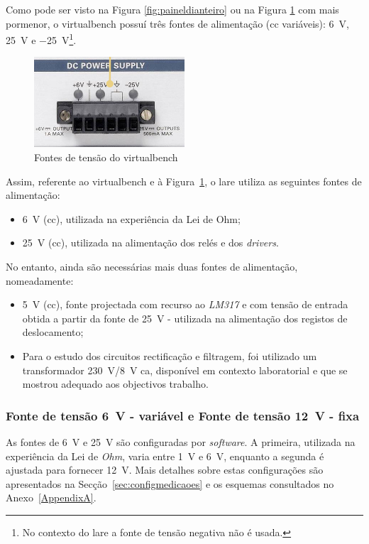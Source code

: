 Como pode ser visto na Figura \ref{fig:paineldianteiro} ou na Figura \ref{fig:promenorfontes} com mais pormenor, o \acrshort{virtualbench} possuí três fontes de alimentação (\acrshort{cc} variáveis): \SI{+6}{\volt}, \SI{+25}{\volt} e \SI{-25}{\volt}\footnote{No contexto do \acrshort{lare} a fonte de tensão negativa não é usada.}.

\begin{figure}[hbtp]
	\centering
	\includegraphics[width=0.5\textwidth]{figures/fontes_VB.png}
	\caption{Fontes de tensão do \acrshort{virtualbench}}
	\label{fig:promenorfontes}
\end{figure}

Assim, referente ao \acrshort{virtualbench} e à Figura~\ref{fig:promenorfontes}, o \acrshort{lare} utiliza as seguintes fontes de alimentação:
\begin{itemize}
	\item \SI{6}{\volt} (\acrshort{cc}), utilizada na experiência da Lei de Ohm;
	\item \SI{25}{\volt} (\acrshort{cc}), utilizada na alimentação dos relés e dos \textit{drivers}.
\end{itemize}

No entanto, ainda são necessárias mais duas fontes de alimentação, nomeadamente:
\begin{itemize}
	\item \SI{5}{\volt} (\acrshort{cc}), fonte projectada com recurso ao \textit{LM317} e com tensão de entrada obtida a partir da fonte de \SI{25}{\volt} - utilizada na alimentação dos registos de deslocamento;
	\item Para o estudo dos circuitos rectificação e filtragem, foi utilizado um transformador \SI{230}{\volt}/\SI{8}{\volt} \acrshort{ca}, disponível em contexto laboratorial e que se mostrou adequado aos objectivos trabalho.
\end{itemize}

\subsubsection{Fonte de tensão \SI{6}{\volt} - variável e {Fonte de tensão \SI{12}{\volt} - fixa}}
\label{sec:fontes6-12}
As fontes de \SI{6}{\volt} e \SI{25}{\volt} são configuradas por \textit{software}. A primeira, utilizada na experiência da Lei de \textit{Ohm}, varia entre \SI{1}{\volt} e \SI{6}{\volt}, enquanto a segunda é ajustada para fornecer \SI{12}{\volt}. Mais detalhes sobre estas configurações são apresentados na Secção~\ref{sec:configmedicaoes} e os esquemas consultados no Anexo~\ref{AppendixA}.

